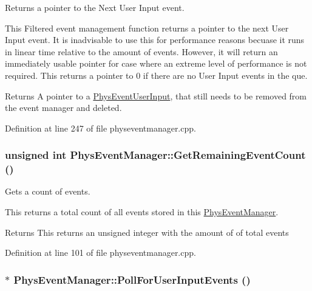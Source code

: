 Returns a pointer to the Next User Input event. 

This Filtered event management function returns a pointer to the next User Input event. It is inadvisable to use this for performance reasons becuase it runs in linear time relative to the amount of events. However, it will return an immediately usable pointer for case where an extreme level of performance is not required. This returns a pointer to 0 if there are no User Input events in the que. \begin{DoxyReturn}{Returns}
A pointer to a \hyperlink{classPhysEventUserInput}{PhysEventUserInput}, that still needs to be removed from the event manager and deleted. 
\end{DoxyReturn}


Definition at line 247 of file physeventmanager.cpp.

\hypertarget{classPhysEventManager_ab14d238e7abe9919be8e2d9eef388b64}{
\subsubsection[{GetRemainingEventCount}]{\setlength{\rightskip}{0pt plus 5cm}unsigned int PhysEventManager::GetRemainingEventCount ()}}
\label{d5/dd7/classPhysEventManager_ab14d238e7abe9919be8e2d9eef388b64}


Gets a count of events. 

This returns a total count of all events stored in this \hyperlink{classPhysEventManager}{PhysEventManager}. \begin{DoxyReturn}{Returns}
This returns an unsigned integer with the amount of of total events 
\end{DoxyReturn}


Definition at line 101 of file physeventmanager.cpp.

\hypertarget{classPhysEventManager_ac66ebe495e2a77d06803291711528db2}{
\subsubsection[{PollForUserInputEvents}]{ $\ast$ PhysEventManager::PollForUserInputEvents ()}}
\label{d5/dd7/classPhysEventManager_ac66ebe495e2a77d06803291711528db2}


